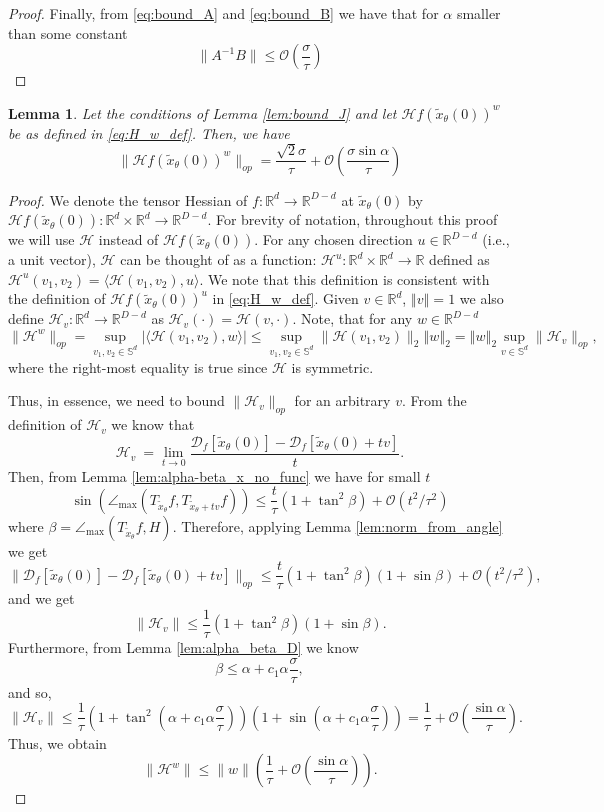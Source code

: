 \documentclass[12pt]{article}
\newtheorem{Lemma}[Theorem]{Lemma}
\theoremstyle{remark}
\newcommand{\RR}{\mathbb{R}}
\newcommand{\DD}{\mathcal{D}}
\newcommand{\OO}{\mathcal{O}}
\newcommand{\HH}{\mathcal{H}}
\newcommand{\norm}[1]{\left\Vert #1 \right\Vert}
\newcommand{\wtilde}[1]{\widetilde{#1}}
\newcommand{\lrangle}[1]{\langle #1 \rangle}
\newcommand{\maxangle}{\angle_{\max}}
\begin{document}
\begin{appendices}
\begin{proof}
Finally, from  \eqref{eq:bound_A} and \eqref{eq:bound_B} we have that for $\alpha$ smaller than some constant
\[
\|A^{-1}B\| \leq \OO(\frac{\sigma}{\tau})
\]
\end{proof}

\begin{Lemma}\label{lem:bound_DDf}
Let the conditions of Lemma \ref{lem:bound_J} and let $\HH f(\wtilde x_\theta(0))^w$ be as defined in \eqref{eq:H_w_def}.
Then, we have
\[
\|\HH f(\wtilde x_\theta(0))^w\|_{op} = \frac{\sqrt{2}\sigma}{\tau} + \OO\left(\frac{\sigma\sin \alpha}{\tau}\right)
\]
\end{Lemma}
\begin{proof}
We denote the tensor Hessian of $f:\RR^d\to\RR^{D-d}$ at $\wtilde x_\theta(0)$ by $\HH f(\wtilde x_\theta(0)):\RR^d\times\RR^d \to \RR^{D-d}$. 
For brevity of notation, throughout this proof we will use $\HH$ instead of $\HH f(\wtilde x_\theta(0))$. For any chosen direction $u\in \RR^{D-d}$ (i.e., a unit vector), $\HH$ can be thought of as a function:
$\HH ^u:\RR^d\times\RR^d \to \RR$
defined as $\HH ^u(v_1,v_2) = \lrangle{\HH (v_1,v_2), u}$. 
We note that this definition is consistent with the definition of $\HH f(\wtilde x_\theta(0))^u$ in \eqref{eq:H_w_def}.
Given $v\in\RR^d$, $\norm{v} = 1$ we also define $\HH_v:\RR^d \to \RR^{D-d}$
as $\HH_v(\cdot) = \HH(v,\cdot)$.
Note, that for any $w\in \RR^{D-d}$ 
\[
{\|\HH^w\|_{op}} = {\sup\limits_{v_1, v_2\in \mathbb{S}^{d}}|\lrangle{\HH(v_1, v_2), w}|} 
\leq \sup\limits_{v_1, v_2\in \mathbb{S}^{d}}\|\HH(v_1, v_2)\|_2\norm{w}_2
= \norm{w}_2\sup_{v\in\mathbb{S}^d}\|\HH_v\|_{op}
,\]
where the right-most equality is true since $\HH$ is symmetric.

Thus, in essence, we need to bound $\|\HH_v\|_{op}$ for an arbitrary $v$. 
From the definition of $\HH_v$ we know that 
\[
\HH_v\ =  \lim_{t\to 0} \frac{\DD_f[\wtilde x_\theta(0)] - \DD_f[\wtilde x_\theta(0) + tv]}{t} 
.\]
Then, from Lemma \ref{lem:alpha-beta_x_no_func}  we have for small $t$
\[
\sin(\maxangle (T_{\wtilde x_\theta}f,T_{\wtilde x_\theta + tv}f))\leq \frac{t}{\tau}(1+\tan^2\beta)+\OO(t^2/\tau^2)
\]
where $\beta = \maxangle(T_{\wtilde x_\theta}f,H)$. 
Therefore, applying Lemma \ref{lem:norm_from_angle} we get 
\[
 \|\DD_f[\wtilde x_\theta(0)] - \DD_f[\wtilde x_\theta(0) + tv] \|_{op} \leq \frac{t}{\tau}(1+\tan^2\beta)(1+\sin \beta) + \OO(t^2/\tau^2)
,\]
and we get 
\[
\|\HH_v\| \leq  \frac{1}{\tau}(1+\tan^2\beta)(1+\sin \beta)
.\]
Furthermore, from Lemma \ref{lem:alpha_beta_D} we know 
\[
\beta \leq \alpha + c_1\alpha{\frac{\sigma}{\tau}}
,\]
and so,
\[
\|\HH_v\| \leq  \frac{1}{\tau}(1+\tan^2
\left(\alpha + c_1\alpha{\frac{\sigma}{\tau}}\right))(1+\sin \left(\alpha + c_1\alpha{\frac{\sigma}{\tau}}\right))
= \frac{1}{\tau} + \OO(\frac{\sin \alpha}{\tau})
.\]
Thus, we obtain
\begin{equation}\label{eq:norm_H^w_bound}
\|\HH^w\| \leq \|w\| \left(\frac{1}{\tau} + \OO(\frac{\sin \alpha}{\tau})\right)    
.\end{equation}



\end{proof}
\end{appendices}
\end{document}
